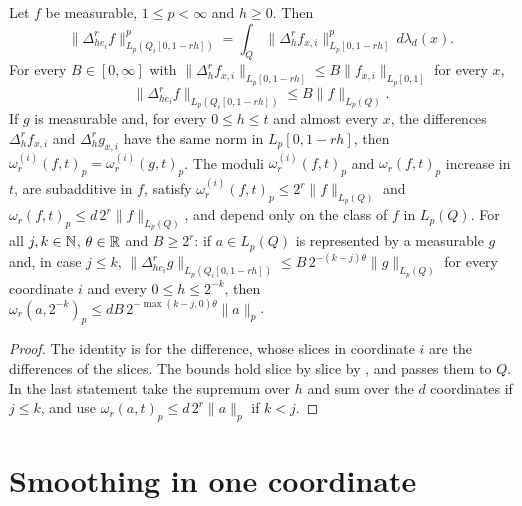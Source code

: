 \begin{lemma}
\label{lem:cube-modulus}
\leanok
{}
Let $f$ be measurable, $1 \leq p < \infty$ and $h \geq 0$. Then
\[
  \|\Delta^r_{h e_i} f\|_{L_p(Q_i[0, 1 - rh])}^p
  = \int_Q \|\Delta_h^r f_{x,i}\|_{L_p[0, 1 - rh]}^p \, d\lambda_d(x) .
\]
For every $B \in [0, \infty]$ with
$\|\Delta_h^r f_{x,i}\|_{L_p[0, 1 - rh]} \leq B \|f_{x,i}\|_{L_p[0,1]}$ for every $x$,
\[
  \|\Delta^r_{h e_i} f\|_{L_p(Q_i[0, 1 - rh])} \leq B \|f\|_{L_p(Q)} .
\]
If $g$ is measurable and, for
every $0 \leq h \leq t$ and almost every $x$, the differences $\Delta_h^r f_{x,i}$ and
$\Delta_h^r g_{x,i}$ have the same norm in $L_p[0, 1 - rh]$, then
$\omega_r^{(i)}(f, t)_p = \omega_r^{(i)}(g, t)_p$.
The moduli $\omega_r^{(i)}(f, t)_p$ and $\omega_r(f, t)_p$ increase in $t$, are subadditive in $f$,
satisfy $\omega_r^{(i)}(f, t)_p \leq 2^r \|f\|_{L_p(Q)}$ and
$\omega_r(f, t)_p \leq d \, 2^r \|f\|_{L_p(Q)}$, and depend only on the class of $f$ in $L_p(Q)$.
For all $j, k \in \mathbb{N}$, $\theta \in \mathbb{R}$ and $B \geq 2^r$: if $a \in L_p(Q)$ is represented by a
measurable $g$ and, in case $j \leq k$,
$\|\Delta^r_{h e_i} g\|_{L_p(Q_i[0, 1 - rh])} \leq B \, 2^{-(k-j)\theta} \|g\|_{L_p(Q)}$ for every
coordinate $i$ and every $0 \leq h \leq 2^{-k}$, then
$\omega_r(a, 2^{-k})_p \leq d B \, 2^{-\max(k-j, 0)\theta} \|a\|_p$.
\end{lemma}

\begin{proof}
\leanok
The identity is  for the difference, whose slices in coordinate $i$ are the
differences of the slices. The bounds hold slice by slice by , and
 passes them to $Q$. In the last statement take the supremum over $h$ and
sum over the $d$ coordinates if $j \leq k$, and use $\omega_r(a, t)_p \leq d \, 2^r \|a\|_p$ if
$k < j$.
\end{proof}

\section{Smoothing in one coordinate}

